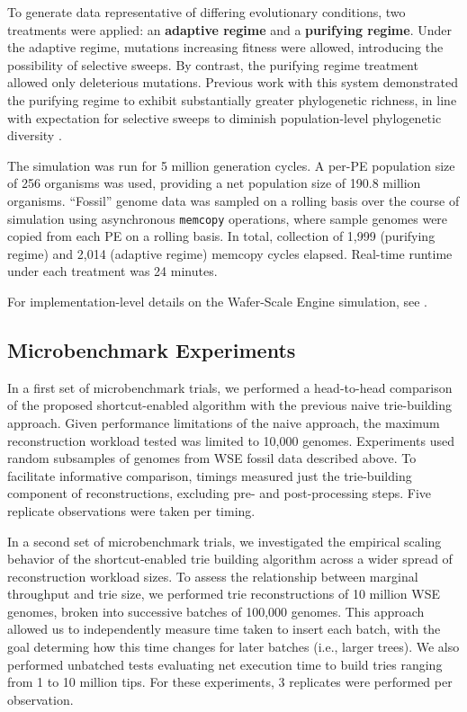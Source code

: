 To generate data representative of differing evolutionary conditions, two treatments were applied: an
\textbf{adaptive regime} and a \textbf{purifying regime}.
Under the adaptive regime, mutations increasing fitness were allowed, introducing the possibility of selective sweeps.
By contrast, the purifying regime treatment allowed only deleterious mutations.
Previous work with this system demonstrated the purifying regime to exhibit substantially greater phylogenetic richness, in line with expectation for selective sweeps to diminish population-level phylogenetic diversity \citep{moreno2024trackable}.

The simulation was run for 5 million generation cycles.
A per-PE population size of 256 organisms was used, providing a net population size of 190.8 million organisms.
``Fossil'' genome data was sampled on a rolling basis over the course of simulation using asynchronous \texttt{memcopy} operations, where sample genomes were copied from each PE on a rolling basis.
In total, collection of 1,999 (purifying regime) and 2,014 (adaptive regime) memcopy cycles elapsed.
Real-time runtime under each treatment was 24 minutes.

For implementation-level details on the Wafer-Scale Engine simulation, see \citep{moreno2024trackable}.

\subsection{Microbenchmark Experiments}

In a first set of microbenchmark trials, we performed a head-to-head comparison of the proposed shortcut-enabled algorithm with the previous naive trie-building approach.
Given performance limitations of the naive approach, the maximum reconstruction workload tested was limited to 10,000 genomes.
Experiments used random subsamples of genomes from WSE fossil data described above.
To facilitate informative comparison, timings measured just the trie-building component of reconstructions, excluding pre- and post-processing steps.
Five replicate observations were taken per timing.

In a second set of microbenchmark trials, we investigated the empirical scaling behavior of the shortcut-enabled trie building algorithm across a wider spread of reconstruction workload sizes.
To assess the relationship between marginal throughput and trie size, we performed trie reconstructions of 10 million WSE genomes, broken into successive batches of 100,000 genomes.
This approach allowed us to independently measure time taken to insert each batch, with the goal determing how this time changes for later batches (i.e., larger trees).
We also performed unbatched tests evaluating net execution time to build tries ranging from 1 to 10 million tips.
For these experiments, 3 replicates were performed per observation.

